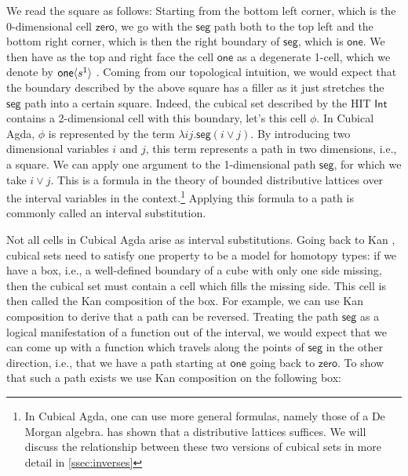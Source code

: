 \documentclass{llncs}
\newcommand{\smap}[1]{s^{{#1}}}
\newcommand{\cont}[2]{\ensuremath{ \ifthenelse{\equal{#2}{}}{#1}{{#1}\langle{#2}\rangle}} }
\newcommand{\cset}[1]{\ensuremath{\mathsf{{#1}}}}
\begin{document}
We read the square as follows: Starting from the bottom left corner, which is
the 0-dimensional cell \cset{zero}, we go with the \cset{seg} path both to the
top left and the bottom right corner, which is then the right boundary of
\cset{seg}, which is \cset{one}. We then have as the top and right face 
the cell \cset{one} as a degenerate 1-cell, which we denote by
\cont{\cset{one}}{\smap{1}}. Coming from our topological intuition, we would
expect that the boundary described by the above square has a filler as it just
stretches the \cset{seg} path into a certain square. Indeed, the cubical set
described by the HIT \cset{Int} contains a 2-dimensional cell with
this boundary, let's this cell $\phi$. In Cubical Agda, $\phi$ is represented by the term
$\lambda i j .\cset{seg} (i \vee j)$. By introducing two dimensional variables
$i$ and $j$, this term represents a path
in two dimensions, i.e., a square. We can apply one argument to the
1-dimensional path
\cset{seg}, for which we take $i \vee j$. This is a formula in the theory of
bounded distributive lattices over the interval variables in the
context.\footnote{In Cubical Agda, one can use more general formulas, namely
  those of a De Morgan algebra. \cite{orton17_axiom_model_cubic_type_theor_topos} has shown
  that a distributive lattices suffices. We will discuss the
  relationship between these two versions of cubical sets in more detail in
  \autoref{ssec:inverses}}
Applying this formula to a path is commonly called an interval substitution.

Not all cells in Cubical Agda arise as interval substitutions. Going
back to Kan \cite{kan55_abstr_homot}, cubical sets need to satisfy one property
to be a model for homotopy types: if we have a box, i.e., a
well-defined boundary of a cube with only one side missing, then the cubical set
must contain a cell
which fills the missing side. This cell is then called the Kan composition of
the box. For example, we can use Kan composition to derive that a path can be reversed. 
Treating the path \cset{seg} as a logical manifestation of a function out of the
interval, we would expect that we can come up with a function which travels
along the points of \cset{seg} in the other direction, i.e., that we have a path starting at
\cset{one} going back to \cset{zero}. To show that such a path exists we use Kan
composition on the following box:

\begin{center}
\end{center}
\end{document}
